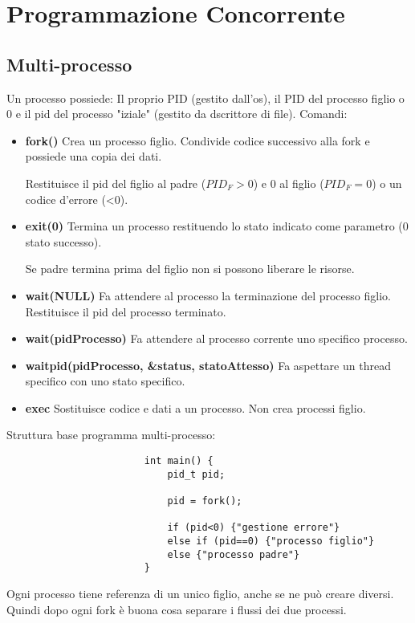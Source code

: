 \section{Programmazione Concorrente}

\subsection{Multi-processo}
Un processo possiede: Il proprio PID (gestito dall'os), il PID del processo figlio o 0 e il pid del processo "iziale" (gestito da dscrittore di file). Comandi:

\begin{itemize}
	\item \textbf{fork()}  Crea un processo figlio. Condivide codice successivo alla fork e possiede una copia dei dati.

	Restituisce il pid del figlio al padre ($PID_F>0$) e 0 al figlio ($PID_F=0$) o un codice d'errore (<0).

	\item \textbf{exit(0)} Termina un processo restituendo lo stato indicato come parametro (0 stato successo).

	Se padre termina prima del figlio non si possono liberare le risorse.

	\item \textbf{wait(NULL)} Fa attendere al processo la terminazione del processo figlio. Restituisce il pid del processo terminato.

	\item \textbf{wait(pidProcesso)} Fa attendere al processo corrente uno specifico processo.

	\item \textbf{waitpid(pidProcesso, \&status, statoAttesso)} Fa aspettare un thread specifico con uno stato specifico.

	\item \textbf{exec} Sostituisce codice e dati a un processo. Non crea processi figlio.
\end{itemize}

Struttura base programma multi-processo:
\begin{verbatim}
						int main() {
							pid_t pid;

							pid = fork();

							if (pid<0) {"gestione errore"}
							else if (pid==0) {"processo figlio"}
							else {"processo padre"}
						}
\end{verbatim}

Ogni processo tiene referenza di un unico figlio, anche se ne può creare diversi. Quindi dopo ogni fork è buona cosa separare i flussi dei due processi.

